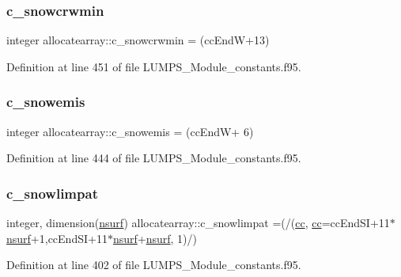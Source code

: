 \subsubsection{\texorpdfstring{c\+\_\+snowcrwmin}{c\_snowcrwmin}}
{\footnotesize\ttfamily integer allocatearray\+::c\+\_\+snowcrwmin = (cc\+EndW+13)}



Definition at line 451 of file L\+U\+M\+P\+S\+\_\+\+Module\+\_\+constants.\+f95.

\mbox{\label{namespaceallocatearray_ae99fe2af29160de023e0a5f25ad4452e}} 
\subsubsection{\texorpdfstring{c\+\_\+snowemis}{c\_snowemis}}
{\footnotesize\ttfamily integer allocatearray\+::c\+\_\+snowemis = (cc\+EndW+ 6)}



Definition at line 444 of file L\+U\+M\+P\+S\+\_\+\+Module\+\_\+constants.\+f95.

\mbox{\label{namespaceallocatearray_a530b446aad98c04f5e7999ac4a5e6c9e}} 
\subsubsection{\texorpdfstring{c\+\_\+snowlimpat}{c\_snowlimpat}}
{\footnotesize\ttfamily integer, dimension(\hyperlink{namespaceallocatearray_acd22f92a06f7e9a2a91426b3dc99fdb0}{nsurf}) allocatearray\+::c\+\_\+snowlimpat =(/(\hyperlink{namespaceallocatearray_ac863c81704eb507dee10f5e10741e10c}{cc}, \hyperlink{namespaceallocatearray_ac863c81704eb507dee10f5e10741e10c}{cc}=cc\+End\+SI+11$\ast$\hyperlink{namespaceallocatearray_acd22f92a06f7e9a2a91426b3dc99fdb0}{nsurf}+1,cc\+End\+SI+11$\ast$\hyperlink{namespaceallocatearray_acd22f92a06f7e9a2a91426b3dc99fdb0}{nsurf}+\hyperlink{namespaceallocatearray_acd22f92a06f7e9a2a91426b3dc99fdb0}{nsurf}, 1)/)}



Definition at line 402 of file L\+U\+M\+P\+S\+\_\+\+Module\+\_\+constants.\+f95.

